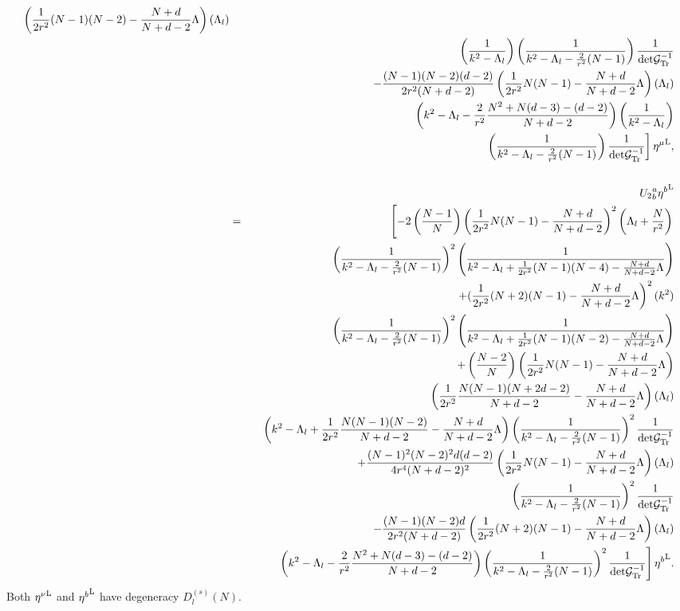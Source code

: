 \documentclass[a4paper,aps,preprint,groupedaddress,showpacs]{revtex4}
\begin{document}
\begin{eqnarray}
\left(\frac{1}{2r^{2}}(N-1)(N-2)-
\frac{N+d}{N+d-2}\Lambda\right)(\Lambda_{l})
\nonumber\\
&&\ \ \ \ 
\left(\frac{1}{k^{2}-\Lambda_{l}}\right)
\left(\frac{1}{k^{2}-\Lambda_{l}-\frac{2}{r^{2}}(N-1)}\right) 
\frac{1}{{\rm det}{\cal G}^{-1}_{\rm Tr}}
\nonumber\\
&&\ \ -\frac{(N-1)(N-2)(d-2)}{2r^{2}(N+d-2)}
\left(\frac{1}{2r^{2}}N(N-1)-
\frac{N+d}{N+d-2}\Lambda\right)(\Lambda_{l})
\nonumber\\
&&\ \ \ \left(k^{2}-\Lambda_{l}-\frac{2}{r^{2}}
\frac{N^{2}+N(d-3)-(d-2)}{N+d-2}\right)
\left(\frac{1}{k^{2}-\Lambda_{l}}\right)
\nonumber\\
&&\ \ \ \ \left.
\left(\frac{1}{k^{2}-\Lambda_{l}-\frac{2}{r^{2}}(N-1)}\right) 
\frac{1}{{\rm det}{\cal G}^{-1}_{\rm Tr}}
\right]{\eta^{\mu}}^{\rm L},
\nonumber\\
\\
&&{U_{2}}^{a}_{b}{\eta^{b}}^{\rm L}
\nonumber\\
&=&
\left[-2\left(\frac{N-1}{N}\right)
\left(\frac{1}{2r^{2}}N(N-1)-\frac{N+d}{N+d-2}\right)^{2}
\left(\Lambda_{l}+\frac{N}{r^{2}}\right)\right.
\nonumber\\
&&\ \ \ \ 
\left(\frac{1}{k^{2}-\Lambda_{l}-\frac{2}{r^{2}}(N-1)}\right)^{2}
\left(\frac{1}{k^{2}-\Lambda_{l}+\frac{1}{2r^{2}}(N-1)(N-4)-
\frac{N+d}{N+d-2}\Lambda}\right)
\nonumber\\
&&\ \ \left.+(\frac{1}{2r^{2}}(N+2)(N-1)-
\frac{N+d}{N+d-2}\Lambda\right)^{2}(k^{2})
\nonumber\\
&&\ \ \ \
\left(\frac{1}{k^{2}-\Lambda_{l}-\frac{2}{r^{2}}(N-1)}\right)^{2}
\left(\frac{1}{k^{2}-\Lambda_{l}+\frac{1}{2r^{2}}(N-1)(N-2)-
\frac{N+d}{N+d-2}\Lambda}\right)
\nonumber\\
&&\ \ +\left(\frac{N-2}{N}\right)
\left(\frac{1}{2r^{2}}N(N-1)-\frac{N+d}{N+d-2}\Lambda\right)
\nonumber\\
&&\ \ \ \
\left(\frac{1}{2r^{2}}\frac{N(N-1)(N+2d-2)}{N+d-2}-
\frac{N+d}{N+d-2}\Lambda\right)(\Lambda_{l}) 
\nonumber\\
&&\ \ \ \left(k^{2}-\Lambda_{l}+\frac{1}{2r^{2}}
\frac{N(N-1)(N-2)}{N+d-2}-
\frac{N+d}{N+d-2}\Lambda\right)
\left(\frac{1}{k^{2}-\Lambda_{l}-\frac{2}{r^{2}}(N-1)}\right)^{2}
\frac{1}{{\rm det}{\cal G}^{-1}_{\rm Tr}}
\nonumber\\
&&\ \ +\frac{(N-1)^{2}(N-2)^{2}d(d-2)}{4r^{4}(N+d-2)^{2}}
\left(\frac{1}{2r^{2}}N(N-1)-
\frac{N+d}{N+d-2}\Lambda\right)(\Lambda_{l})
\nonumber\\
&&\ \ \ \
\left(\frac{1}{k^{2}-\Lambda_{l}-\frac{2}{r^{2}}(N-1)}\right)^{2}
\frac{1}{{\rm det}{\cal G}^{-1}_{\rm Tr}}
\nonumber\\
&&\ \ -\frac{(N-1)(N-2)d}{2r^{2}(N+d-2)}
\left(\frac{1}{2r^{2}}(N+2)(N-1)-
\frac{N+d}{N+d-2}\Lambda\right)(\Lambda_{l})
\nonumber\\
&&\ \ \ \ \left.
\left(k^{2}-\Lambda_{l}-
\frac{2}{r^{2}}\frac{N^{2}+N(d-3)-(d-2)}{N+d-2}\right)
\left(\frac{1}{k^{2}-\Lambda_{l}-\frac{2}{r^{2}}(N-1)}\right)^{2}
\frac{1}{{\rm det}{\cal G}^{-1}_{\rm Tr}}
\right]{\eta^{b}}^{\rm L}.
\nonumber\\
\end{eqnarray}
Both ${\eta^{\nu}}^{\rm L}$ and ${\eta^{b}}^{\rm L}$ have 
degeneracy $D^{(s)}_{l}(N)$.
\end{document}
